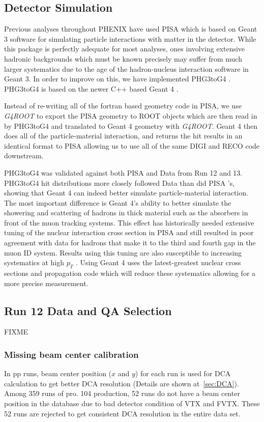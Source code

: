 \documentclass[12pt]{article}
\newcommand{\PISA}{\textsf{PISA} }
\newcommand{\pt}{$p_{T}$ }
\begin{document}
\subsection{Detector Simulation}
\label{sec:DetSim}
Previous analyses throughout PHENIX have used \PISA which is based on Geant 3 software for simulating particle interactions
with matter in the detector.  While this package is perfectly adequate for most analyses, ones involving extensive hadronic backgrounds
which must be known precisely may suffer from much larger systematics due to the age of the hadron-nucleus interaction software in 
Geant 3.  In order to improve on this, we have implemented PHG3toG4 \cite{ref:PHG3toG4}.  PHG3toG4 is based on the newer C++ based Geant 4 \cite{ref:Geant4}.

Instead of re-writing all of the fortran based geometry code in PISA, we use {\it G4ROOT} \cite{ref:G4ROOT} to export the \PISA geometry to ROOT objects which 
are then read in by PHG3toG4 and translated to Geant 4 geometry with {\it G4ROOT}.  Geant 4 then does all of the particle-material interaction,
and returns the hit results in an identical format to \PISA allowing us to use all of the same DIGI and RECO code downstream. 

PHG3toG4 was validated against both \PISA and Data from Run 12 and 13.  PHG3toG4 hit distributions more closely followed Data than did \PISA's, 
showing that Geant 4 can indeed better simulate particle-material interaction.  The most important difference is Geant 4's ability to better simulate the
showering and scattering of hadrons in thick material such as the absorbers in front of the muon tracking systems.  This effect has historically needed extensive
tuning of the nuclear interaction cross section in \PISA and still resulted in poor agreement with data for hadrons that make it to the third and fourth gap 
in the muon ID system.  Results using this tuning are also susceptible to increasing systematics at high \pt.  Using Geant 4 uses the latest-greatest
nuclear cross sections and propagation code which will reduce these systematics allowing for a more precise measurement.


\subsection{Run 12 Data and QA Selection}
{\color{red}FIXME}
\subsubsection{Missing beam center calibration}
In pp runs, beam center position ($x$ and $y$) for each run is used for DCA calculation to get better DCA resolution (Details are shown at~\ref{sec:DCA}).
Among 359 runs of pro. 104 production, 52 runs do not have a beam center position in the database due to bad detector condition of VTX and FVTX.
These 52 runs are rejected to get consistent DCA resolution in the entire data set.
\end{document}
